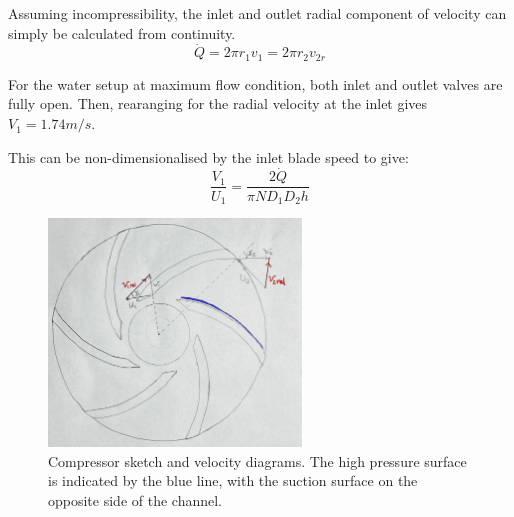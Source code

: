 \documentclass{article}
\begin{document}

Assuming incompressibility, the inlet and outlet radial component of velocity can simply be calculated from continuity.
\begin{equation}
    \dot{Q} = 2\pi r_1 v_1 = 2\pi r_2 v_{2r}
\end{equation}

For the water setup at maximum flow condition, both inlet and outlet valves are fully open.
Then, rearanging for the radial velocity at the inlet gives $V_1 = 1.74 m/s$.

This can be non-dimensionalised by the inlet blade speed to give:
\begin{equation}
    \frac{V_1}{U_1} = \frac{2\dot{Q}}{\pi N D_1 D_2 h}
\end{equation}


\begin{figure}[H]
    \centering
    \includegraphics[width=0.6\textwidth]{velocity_diagrams.jpg}
    \caption{Compressor sketch and velocity diagrams. The high pressure surface is indicated by the blue line, with the suction surface on the opposite side of the channel.}
    \label{fig:vel_diagrams}
\end{figure}

\end{document}
